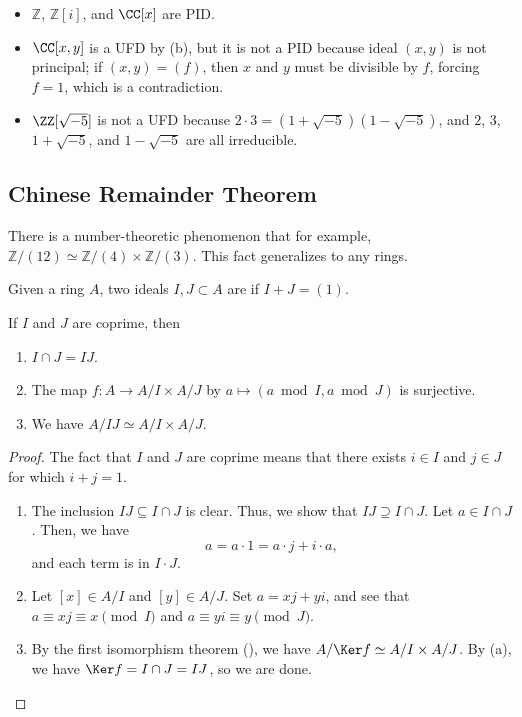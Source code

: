 \begin{example}
    \begin{itemize}
    \item $\mathbb Z$, $\mathbb Z[i]$, and $\CC[x]$
    are PID.
    \item $\CC[x,y]$ is a UFD by  (b),
    but it is not a PID because ideal $(x,y)$ is not principal;
    if $(x,y)=(f)$, then $x$ and $y$ must be divisible by $f$,
    forcing $f=1$, which is a contradiction.
    \item $\ZZ[\sqrt{-5}]$ is not a UFD
    because $2\cdot 3 = (1+\sqrt{-5})(1-\sqrt{-5})$,
    and $2$, $3$, $1+\sqrt{-5}$, and $1-\sqrt{-5}$
    are all irreducible.
    \end{itemize}
\end{example}

\subsection{Chinese Remainder Theorem}
There is a number-theoretic phenomenon that
for example, $\mathbb Z/(12)\simeq \mathbb Z/(4)
\times \mathbb Z/(3)$.
This fact generalizes to any rings.
\begin{definition}
    Given a ring $A$, two ideals $I,J\subset A$
    are  if $I+J=(1)$.
\end{definition}
\begin{theorem}
    \label{thm:crt}
    If $I$ and $J$ are coprime, then
    \begin{enumerate}[label=(\alph*)]
    \item $I\cap J = IJ$.
    \item The map $f : A\to A/I\times A/J$ by
	$a\mapsto (a\bmod I, a\bmod J)$ is surjective.
    \item We have
	$A/IJ \simeq A/I\times A/J$.
    \end{enumerate}
\end{theorem}
\begin{proof}
    The fact that $I$ and $J$ are coprime
    means that there exists $i\in I$ and $j\in J$
    for which $i+j=1$.
    \begin{enumerate}[label=(\alph*)]
    \item The inclusion $IJ\subseteq I\cap J$ is clear.
    Thus, we show that $IJ\supseteq I\cap J$.
	Let $a\in I\cap J$.
	Then, we have
	$$a = a\cdot 1 = a\cdot j + i\cdot a,$$
	and each term is in $I\cdot J$.
    \item Let $[x]\in A/I$ and $[y]\in A/J$.
	Set $a=xj+yi$, and see that
	$a\equiv xj\equiv x\pmod I$ and $a\equiv yi
        \equiv y\pmod J$.
    \item By the first isomorphism theorem
    (),
	we have $A/\Ker f \simeq A/I\times A/J$.
        By (a),  we have $\Ker f = I\cap J = IJ$,
        so we are done.
	\qedhere
\end{enumerate}
\end{proof}


